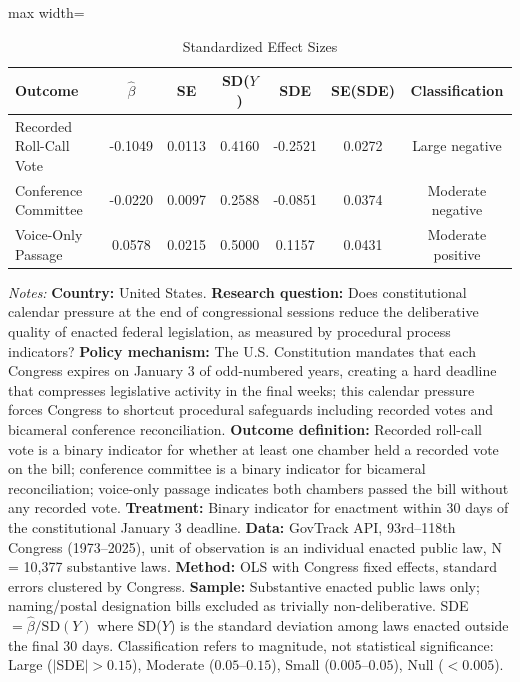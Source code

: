 \begin{table}[t]
\centering
\caption{Standardized Effect Sizes}
\label{tab:sde}
\small
\begin{adjustbox}{max width=\textwidth}
\begin{tabular}{lcccccc}
\toprule
Outcome & $\hat{\beta}$ & SE & SD($Y$) & SDE & SE(SDE) & Classification \\
\midrule
Recorded Roll-Call Vote & -0.1049 & 0.0113 & 0.4160 & -0.2521 & 0.0272 & Large negative \\
Conference Committee & -0.0220 & 0.0097 & 0.2588 & -0.0851 & 0.0374 & Moderate negative \\
Voice-Only Passage & 0.0578 & 0.0215 & 0.5000 & 0.1157 & 0.0431 & Moderate positive \\
\bottomrule
\end{tabular}
\end{adjustbox}
\begin{tablenotes}
\item \textit{Notes:} \textbf{Country:} United States. \textbf{Research question:} Does constitutional calendar pressure at the end of congressional sessions reduce the deliberative quality of enacted federal legislation, as measured by procedural process indicators? \textbf{Policy mechanism:} The U.S. Constitution mandates that each Congress expires on January 3 of odd-numbered years, creating a hard deadline that compresses legislative activity in the final weeks; this calendar pressure forces Congress to shortcut procedural safeguards including recorded votes and bicameral conference reconciliation. \textbf{Outcome definition:} Recorded roll-call vote is a binary indicator for whether at least one chamber held a recorded vote on the bill; conference committee is a binary indicator for bicameral reconciliation; voice-only passage indicates both chambers passed the bill without any recorded vote. \textbf{Treatment:} Binary indicator for enactment within 30 days of the constitutional January 3 deadline. \textbf{Data:} GovTrack API, 93rd--118th Congress (1973--2025), unit of observation is an individual enacted public law, N = 10,377 substantive laws. \textbf{Method:} OLS with Congress fixed effects, standard errors clustered by Congress. \textbf{Sample:} Substantive enacted public laws only; naming/postal designation bills excluded as trivially non-deliberative. SDE $= \hat{\beta} / \text{SD}(Y)$ where SD($Y$) is the standard deviation among laws enacted outside the final 30 days. Classification refers to magnitude, not statistical significance: Large ($|$SDE$| > 0.15$), Moderate ($0.05$--$0.15$), Small ($0.005$--$0.05$), Null ($< 0.005$).
\end{tablenotes}
\end{table}
